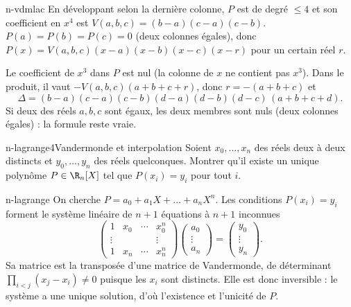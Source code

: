 \begin{corrige}{n-vdmlac}
En développant selon la dernière colonne, $P$ est de degré $\leq4$ et son coefficient en $x^4$ est $V(a,b,c)=(b-a)(c-a)(c-b)$. $P(a)=P(b)=P(c)=0$ (deux colonnes égales), donc $P(x)=V(a,b,c)(x-a)(x-b)(x-c)(x-r)$ pour un certain réel $r$.

Le coefficient de $x^3$ dans $P$ est nul (la colonne de $x$ ne contient pas $x^3$). Dans le produit, il vaut $-V(a,b,c)(a+b+c+r)$, donc $r=-(a+b+c)$ et
\[\Delta=(b-a)(c-a)(c-b)(d-a)(d-b)(d-c)\,(a+b+c+d).\]
Si deux des réels $a,b,c$ sont égaux, les deux membres sont nuls (deux colonnes égales) : la formule reste vraie.
\end{corrige}

\begin{exo}{n-lagrange}{4}{Vandermonde et interpolation}
Soient $x_0,\dots,x_n$ des réels deux à deux distincts et $y_0,\dots,y_n$ des réels quelconques. Montrer qu'il existe un unique polynôme $P\in\R_n[X]$ tel que $P(x_i)=y_i$ pour tout $i$.
\end{exo}

\begin{corrige}{n-lagrange}
On cherche $P=a_0+a_1X+\dots+a_nX^n$. Les conditions $P(x_i)=y_i$ forment le système linéaire de $n+1$ équations à $n+1$ inconnues
\[\begin{pmatrix}1&x_0&\cdots&x_0^n\\\vdots&&&\vdots\\1&x_n&\cdots&x_n^n\end{pmatrix}\begin{pmatrix}a_0\\\vdots\\a_n\end{pmatrix}=\begin{pmatrix}y_0\\\vdots\\y_n\end{pmatrix}.\]
Sa matrice est la transposée d'une matrice de Vandermonde, de déterminant $\prod_{i<j}(x_j-x_i)\neq0$ puisque les $x_i$ sont distincts. Elle est donc inversible : le système a une unique solution, d'où l'existence et l'unicité de $P$.
\end{corrige}

